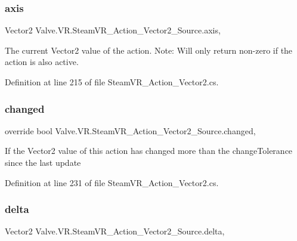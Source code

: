 \subsubsection{\texorpdfstring{axis}{axis}}
{\footnotesize\ttfamily Vector2 Valve.\+V\+R.\+Steam\+V\+R\+\_\+\+Action\+\_\+\+Vector2\+\_\+\+Source.\+axis\hspace{0.3cm}{\ttfamily [get]}, {}}



The current Vector2 value of the action. Note\+: Will only return non-\/zero if the action is also active. 



Definition at line 215 of file Steam\+V\+R\+\_\+\+Action\+\_\+\+Vector2.\+cs.

\mbox{\label{class_valve_1_1_v_r_1_1_steam_v_r___action___vector2___source_a74003e139808d4ebcdfec2d9f6d7c249}} 
\subsubsection{\texorpdfstring{changed}{changed}}
{\footnotesize\ttfamily override bool Valve.\+V\+R.\+Steam\+V\+R\+\_\+\+Action\+\_\+\+Vector2\+\_\+\+Source.\+changed\hspace{0.3cm}{\ttfamily [get]}, {}}



If the Vector2 value of this action has changed more than the change\+Tolerance since the last update 



Definition at line 231 of file Steam\+V\+R\+\_\+\+Action\+\_\+\+Vector2.\+cs.

\mbox{\label{class_valve_1_1_v_r_1_1_steam_v_r___action___vector2___source_aacfb4b6fdcbfa8ccccc4a4b78dd64e6e}} 
\subsubsection{\texorpdfstring{delta}{delta}}
{\footnotesize\ttfamily Vector2 Valve.\+V\+R.\+Steam\+V\+R\+\_\+\+Action\+\_\+\+Vector2\+\_\+\+Source.\+delta\hspace{0.3cm}{\ttfamily [get]}, {}}



